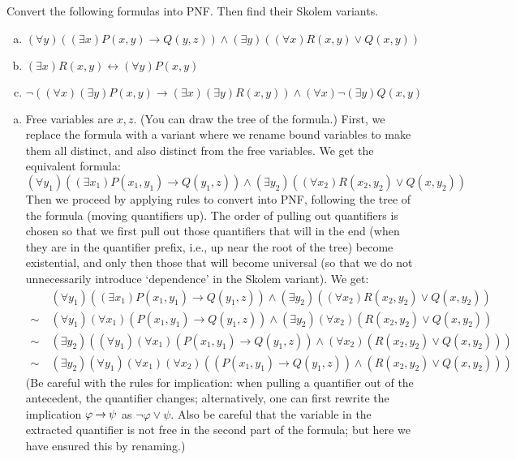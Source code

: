 \begin{problem} 
    
    Convert the following formulas into PNF. Then find their Skolem variants.
    \begin{enumerate}[(a)]
        \item $(\forall y)((\exists x)P(x,y)\to Q(y,z))\wedge (\exists y)((\forall x)R(x,y)\vee Q(x,y))$
        \item $(\exists x)R(x,y)\leftrightarrow (\forall y)P(x,y)$
        \item $\neg((\forall x)(\exists y)P(x,y)\to (\exists x)(\exists y)R(x,y))\wedge(\forall x)\neg(\exists y)Q(x,y)$
    \end{enumerate}

    \begin{solution}

        \begin{enumerate}[(a)]
            \item Free variables are $x,z$. (You can draw the tree of the formula.) First, we replace the formula with a variant where we rename bound variables to make them all distinct, and also distinct from the free variables. We get the equivalent formula:
            $$
            (\forall y_1)((\exists x_1)P(x_1,y_1)\to Q(y_1,z))\wedge (\exists y_2)((\forall x_2)R(x_2,y_2)\vee Q(x,y_2))
            $$
            Then we proceed by applying rules to convert into PNF, following the tree of the formula (moving quantifiers up). The order of pulling out quantifiers is chosen so that we first pull out those quantifiers that will in the end (when they are in the quantifier prefix, i.e., up near the root of the tree) become existential, and only then those that will become universal (so that we do not unnecessarily introduce `dependence' in the Skolem variant). We get:
            \begin{align*}
                &(\forall y_1)((\exists x_1)P(x_1,y_1)\to Q(y_1,z))\wedge (\exists y_2)((\forall x_2)R(x_2,y_2)\vee Q(x,y_2))\\
                \sim\ & (\forall y_1)(\forall x_1)(P(x_1,y_1)\to Q(y_1,z))\wedge (\exists y_2)(\forall x_2)(R(x_2,y_2)\vee Q(x,y_2))\\
                \sim\ & (\exists y_2)((\forall y_1)(\forall x_1)(P(x_1,y_1)\to Q(y_1,z))\wedge (\forall x_2)(R(x_2,y_2)\vee Q(x,y_2)))\\
                \sim\ & (\exists y_2)(\forall y_1)(\forall x_1)(\forall x_2)((P(x_1,y_1)\to Q(y_1,z))\wedge (R(x_2,y_2)\vee Q(x,y_2)))
            \end{align*}
            (Be careful with the rules for implication: when pulling a quantifier out of the antecedent, the quantifier changes; alternatively, one can first rewrite the implication $\varphi\mathbin{\rightarrow}\psi$ as $\neg\varphi\lor\psi$. Also be careful that the variable in the extracted quantifier is not free in the second part of the formula; but here we have ensured this by renaming.)


\end{enumerate}
\end{solution}
\end{problem}
